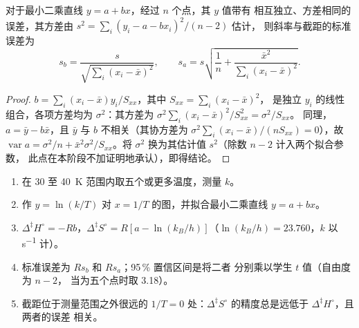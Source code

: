 \begin{proposition}[拟合直线的标准误差]\label{prop:b3:rate-theories:slope-uncertainty}
对于最小二乘直线 $y = a + bx$，经过 $n$ 个点，其 $y$ 值带有
相互独立、方差相同的误差，其方差由 $s^2 = \sum_i(y_i - a - bx_i)^2/(n - 2)$ 估计，
则斜率与截距的标准误差为
\[
  s_b = \frac{s}{\sqrt{\sum_i(x_i - \bar x)^2}}, \qquad
  s_a = s\sqrt{\frac1n + \frac{\bar x^2}{\sum_i(x_i - \bar x)^2}} .
\]
\end{proposition}

\begin{proof}
$b = \sum_i(x_i - \bar x)y_i/S_{xx}$，其中 $S_{xx} = \sum_i(x_i - \bar x)^2$，
是独立 $y_i$ 的线性组合，各项方差均为 $\sigma^2$：其方差为 $\sigma^2\sum_i(x_i - \bar x)^2/S_{xx}^2 = \sigma^2/S_{xx}$。
同理，$a = \bar y - b\bar x$，且 $\bar y$ 与 $b$ 不相关（其协方差为
$\sigma^2\sum_i(x_i - \bar x)/(nS_{xx}) = 0$），故 $\operatorname{var}a = \sigma^2/n + \bar x^2\sigma^2/S_{xx}$。将 $\sigma^2$
换为其估计值 $s^2$（除数 $n - 2$ 计入两个拟合参数，
此点在本阶段不加证明地承认），即得结论。
\end{proof}

\begin{method}[带不确定度的艾林图]\label{met:b3:rate-theories:eyring-plot}
\begin{enumerate}
  \item 在 30 至 \qty{40}{K} 范围内取五个或更多温度，测量 $k$。
  \item 作 $y = \ln(k/T)$ 对 $x = 1/T$ 的图，并拟合最小二乘直线 $y = a + bx$。
  \item $\Delta^{\ddagger}H^\circ = -Rb$，$\Delta^{\ddagger}S^\circ = R[a - \ln(k_B/h)]$（$\ln(k_B/h) = 23.760$，$k$ 以
        \unit{s^{-1}} 计）。
  \item 标准误差为 $Rs_b$ 和 $Rs_a$；95\,\% 置信区间是将二者
        分别乘以学生 $t$ 值（自由度为 $n - 2$，
        当为五个点时取 3.18）。
  \item 截距位于测量范围之外很远的 $1/T = 0$ 处：$\Delta^{\ddagger}S^\circ$
        的精度总是远低于 $\Delta^{\ddagger}H^\circ$，且两者的误差
        相关。
\end{enumerate}
\end{method}

